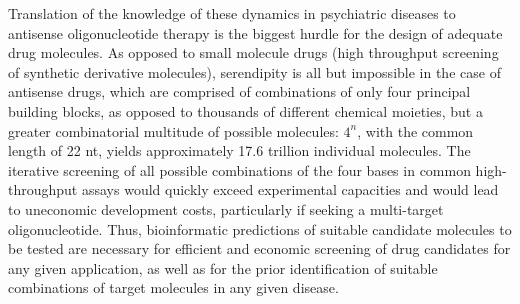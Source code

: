 Translation of the knowledge of these dynamics in psychiatric diseases to antisense oligonucleotide therapy is the biggest hurdle for the design of adequate drug molecules. As opposed to small molecule drugs (high throughput screening of synthetic derivative molecules), serendipity is all but impossible in the case of antisense drugs, which are comprised of combinations of only four principal building blocks, as opposed to thousands of different chemical moieties, but a greater combinatorial multitude of possible molecules: $4^n$, with the common length of 22 nt, yields approximately 17.6 trillion individual molecules. The iterative screening of all possible combinations of the four bases in common high-throughput assays would quickly exceed experimental capacities and would lead to uneconomic development costs, particularly if seeking a multi-target oligonucleotide. Thus, bioinformatic predictions of suitable candidate molecules to be tested are necessary for efficient and economic screening of drug candidates for any given application, as well as for the prior identification of suitable combinations of target molecules in any given disease.

